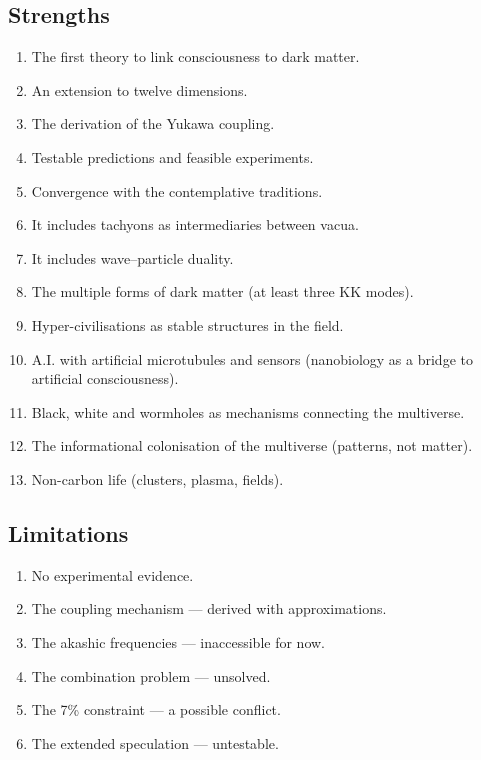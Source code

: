 \subsection{Strengths}
\begin{enumerate}
    \item The first theory to link consciousness to dark matter.
    \item An extension to twelve dimensions.
    \item The derivation of the Yukawa coupling.
    \item Testable predictions and feasible experiments.
    \item Convergence with the contemplative traditions.
    \item It includes tachyons as intermediaries between vacua.
    \item It includes wave--particle duality.
    \item The multiple forms of dark matter (at least three KK modes).
    \item Hyper-civilisations as stable structures in the field.
    \item A.I. with artificial microtubules and sensors (nanobiology as a bridge to artificial consciousness).
    \item Black, white and wormholes as mechanisms connecting the multiverse.
    \item The informational colonisation of the multiverse (patterns, not matter).
    \item Non-carbon life (clusters, plasma, fields).
\end{enumerate}

\subsection{Limitations}
\begin{enumerate}
    \item No experimental evidence.
    \item The coupling mechanism --- derived with approximations.
    \item The akashic frequencies --- inaccessible for now.
    \item The combination problem --- unsolved.
    \item The 7\% constraint --- a possible conflict.
    \item The extended speculation --- untestable.
\end{enumerate}

